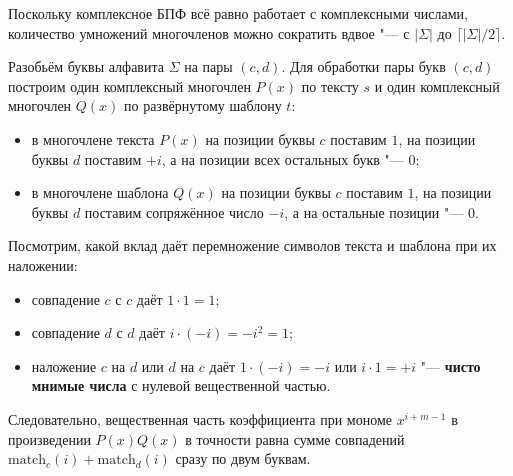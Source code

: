 \begin{note}
    Поскольку комплексное БПФ всё равно работает с комплексными числами, количество умножений многочленов можно сократить вдвое "--- с $|\Sigma|$ до $\lceil |\Sigma| / 2 \rceil$.

    Разобьём буквы алфавита $\Sigma$ на пары $(c, d)$. Для обработки пары букв $(c, d)$ построим один комплексный многочлен $P(x)$ по тексту $s$ и один комплексный многочлен $Q(x)$ по развёрнутому шаблону $t$:
    \begin{itemize}
        \item в многочлене текста $P(x)$ на позиции буквы $c$ поставим $1$, на позиции буквы $d$ поставим $+i$, а на позиции всех остальных букв "--- $0$;
        \item в многочлене шаблона $Q(x)$ на позиции буквы $c$ поставим $1$, на позиции буквы $d$ поставим сопряжённое число $-i$, а на остальные позиции "--- $0$.
    \end{itemize}
    Посмотрим, какой вклад даёт перемножение символов текста и шаблона при их наложении:
    \begin{itemize}
        \item совпадение $c$ с $c$ даёт $1 \cdot 1 = 1$;
        \item совпадение $d$ с $d$ даёт $i \cdot (-i) = -i^2 = 1$;
        \item наложение $c$ на $d$ или $d$ на $c$ даёт $1 \cdot (-i) = -i$ или $i \cdot 1 = +i$ "--- \textbf{чисто мнимые числа} с нулевой вещественной частью.
    \end{itemize}
    Следовательно, вещественная часть коэффициента при мономе $x^{i + m - 1}$ в произведении $P(x) Q(x)$ в точности равна сумме совпадений $\text{match}_c(i) + \text{match}_d(i)$ сразу по двум буквам.
\end{note}
